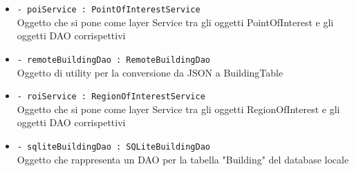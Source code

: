 \documentclass[../DefinizioneDiProdotto.tex]{subfiles}
\begin{document}
\begin{description}
\begin{itemize}
\item \texttt{- poiService : PointOfInterestService}\\
Oggetto che si pone come layer Service tra gli oggetti PointOfInterest e gli oggetti DAO corrispettivi

\item \texttt{- remoteBuildingDao : RemoteBuildingDao}\\
Oggetto di utility per la conversione da JSON a BuildingTable

\item \texttt{- roiService : RegionOfInterestService}\\
Oggetto che si pone come layer Service tra gli oggetti RegionOfInterest e gli oggetti DAO corrispettivi

\item \texttt{- sqliteBuildingDao : SQLiteBuildingDao}\\
Oggetto che rappresenta un DAO per la tabella "Building" del database locale


\end{itemize}
\end{description}
\end{document}
